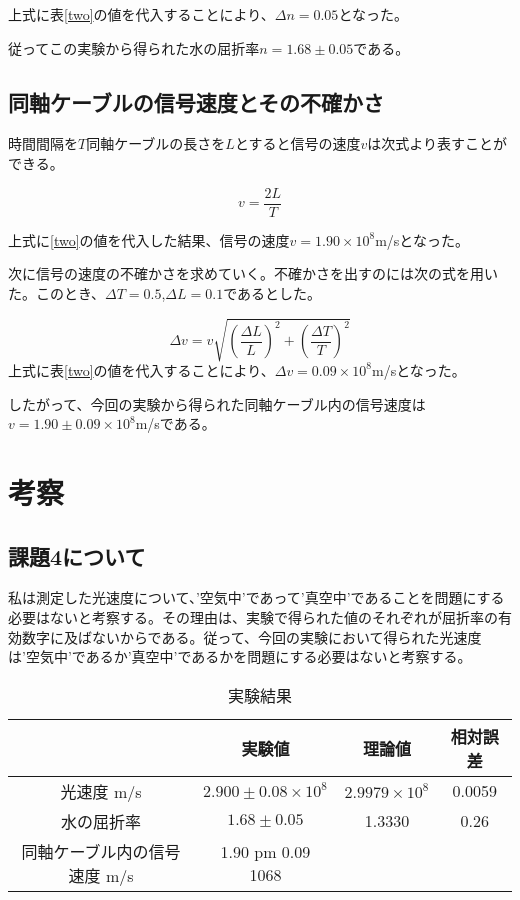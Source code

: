 \documentclass{jsarticle}
\begin{document}
上式に表\ref{two}の値を代入することにより、$\Delta n = 0.05$となった。

従ってこの実験から得られた水の屈折率$n = 1.68 \pm 0.05$である。




\subsection{同軸ケーブルの信号速度とその不確かさ}
時間間隔を$T$同軸ケーブルの長さを$L$とすると信号の速度$v$は次式より表すことができる。

\begin{equation}
    v = \frac{2L}{T}
\end{equation}

上式に\ref{two}の値を代入した結果、信号の速度$v = 1.90 \times 10^8$m/sとなった。\\
\par 次に信号の速度の不確かさを求めていく。不確かさを出すのには次の式を用いた。このとき、$\Delta T = 0.5$,$\Delta L = 0.1$であるとした。

\begin{equation}
    \Delta v = v\sqrt{(\frac{\Delta L}{L})^2 + (\frac{\Delta T}{T})^2}
\end{equation}
上式に表\ref{two}の値を代入することにより、$\Delta v = 0.09 \times 10^8$m/sとなった。

したがって、今回の実験から得られた同軸ケーブル内の信号速度は$v = 1.90 \pm 0.09 \times 10^8$m/sである。



\section{考察}

\subsection{課題4について}
私は測定した光速度について、’空気中’であって’真空中’であることを問題にする必要はないと考察する。その理由は、実験で得られた値のそれぞれが屈折率の有効数字に及ばないからである。従って、今回の実験において得られた光速度は’空気中’であるか’真空中’であるかを問題にする必要はないと考察する。

\begin{table}[H]
\centering
\caption{実験結果}
\label{my-label}
\begin{tabular}{|c|c|c|c|}
\hline
             & 実験値                & 理論値         & 相対誤差  \\ \hline
光速度  m/s        & $2.900 \pm 0.08 \times 10^8$ & $2.9979 \times 10^8$ & 0.0059 \\\hline
水の屈折率        & $1.68 \pm 0.05$       & 1.3330      & 0.26 \\ \hline
同軸ケーブル内の信号速度 m/s & 1.90 pm 0.09 1068  &             &      \\ \hline
\end{tabular}
\end{table}
\end{document}
